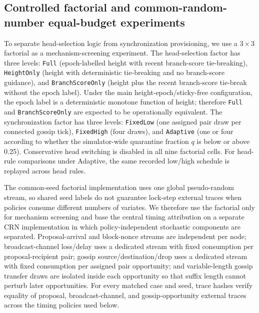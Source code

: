 \documentclass[11pt]{article}
\begin{document}
\subsection{Controlled factorial and common-random-number equal-budget experiments}
To separate head-selection logic from synchronization provisioning, we use a $3\times3$ factorial as a mechanism-screening experiment. The head-selection factor has three levels: \texttt{Full} (epoch-labelled height with recent branch-score tie-breaking), \texttt{HeightOnly} (height with deterministic tie-breaking and no branch-score guidance), and \texttt{BranchScoreOnly} (height plus the recent branch-score tie-break without the epoch label). Under the main height-epoch/sticky-free configuration, the epoch label is a deterministic monotone function of height; therefore \texttt{Full} and \texttt{BranchScoreOnly} are expected to be operationally equivalent. The synchronization factor has three levels: \texttt{FixedLow} (one assigned pair draw per connected gossip tick), \texttt{FixedHigh} (four draws), and \texttt{Adaptive} (one or four according to whether the simulator-wide quarantine fraction $q$ is below or above 0.25). Conservative head switching is disabled in all nine factorial cells. For head-rule comparisons under Adaptive, the same recorded low/high schedule is replayed across head rules.

The common-seed factorial implementation uses one global pseudo-random stream, so shared seed labels do not guarantee lock-step external traces when policies consume different numbers of variates. We therefore use the factorial only for mechanism screening and base the central timing attribution on a separate CRN implementation in which policy-independent stochastic components are separated. Proposal-arrival and block-nonce streams are independent per node; broadcast-channel loss/delay uses a dedicated stream with fixed consumption per proposal-recipient pair; gossip source/destination/drop uses a dedicated stream with fixed consumption per assigned pair opportunity; and variable-length gossip transfer draws are isolated inside each opportunity so that suffix length cannot perturb later opportunities. For every matched case and seed, trace hashes verify equality of proposal, broadcast-channel, and gossip-opportunity external traces across the timing policies used below.
\end{document}
